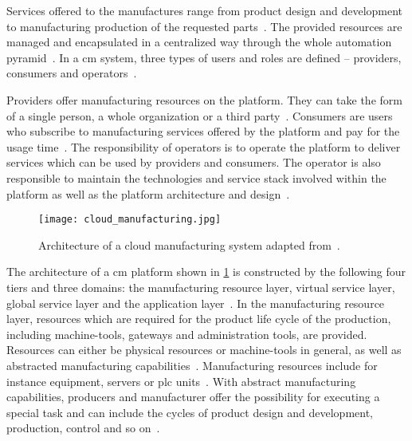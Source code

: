 \documentclass[
a4paper,
twoside,
headsepline,
cleardoublepage=empty,
parskip=half,
draft=false
]{scrbook}
\begin{document}
			Services offered to the manufactures range from product design and development to manufacturing production of the requested parts~\cite{xu2012cloud}. The provided resources  are managed and encapsulated in a centralized way through the whole automation pyramid~\cite{kleinemeier2014automatisierungspyramide}.
			In a \gls{cm} system, three types of users and roles are defined -- providers, consumers and operators~\cite{wu2013cloud}.
			
			Providers offer manufacturing resources on the platform. 
			They can take the form of a single person, a whole organization or a third party~\cite{tao2014cciot}. 
			Consumers are users who subscribe to manufacturing services offered by the platform and pay for the usage time~\cite{he2015state}. 
			The responsibility of operators is to operate the platform to deliver services which can be used by providers and consumers.
			The operator is also responsible to maintain the technologies and service stack involved within the platform as well as the platform architecture and design~\cite{tedeschi2015security}.
			
			\begin{figure}[htbp]
				\centering
				\texttt{[image: cloud\_manufacturing.jpg]}
				\caption{Architecture of a cloud manufacturing system adapted from~\cite{xu2012cloud}.}
				\label{fig:cloud_manufacturing}
			\end{figure}
		
			The architecture of a \gls{cm} platform shown in \cref{fig:cloud_manufacturing} is constructed by the following four tiers and three domains: the manufacturing resource layer, virtual service layer, global service layer and the application layer~\cite{wu2013cloud}.
			In the manufacturing resource layer, resources which are required for the product life cycle of the production, including machine-tools, gateways and administration tools, are provided. 
			Resources can either be physical resources or machine-tools in general, as well as abstracted manufacturing capabilities~\cite{kleinemeier2014automatisierungspyramide}. 
			Manufacturing resources include for instance equipment, servers or \gls{plc} units~\cite{xu2012cloud}. 
			With abstract manufacturing capabilities, producers and manufacturer offer the possibility for executing a special task and can include the cycles of product design and development, production, control and so on~\cite{he2015state}.
			
\end{document}
